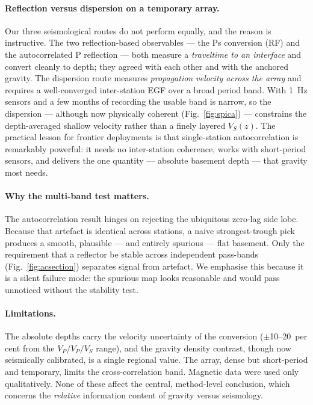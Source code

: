 \paragraph{Reflection versus dispersion on a temporary array.}
Our three seismological routes do not perform equally, and the reason is
instructive. The two reflection-based observables --- the Ps conversion (RF) and
the autocorrelated P reflection --- both measure a \emph{traveltime to an
interface} and convert cleanly to depth; they agreed with each other and with the
anchored gravity. The dispersion route measures \emph{propagation velocity across
the array} and requires a well-converged inter-station EGF over a broad period
band. With 1~Hz sensors and a few months of recording the usable band is narrow,
so the dispersion --- although now physically coherent (Fig.~\ref{fig:spica}) ---
constrains the depth-averaged shallow velocity rather than a finely layered
$V_S(z)$. The practical lesson for frontier deployments is that single-station
autocorrelation is remarkably powerful: it needs no inter-station coherence, works
with short-period sensors, and delivers the one quantity --- absolute basement
depth --- that gravity most needs.

\paragraph{Why the multi-band test matters.}
The autocorrelation result hinges on rejecting the ubiquitous zero-lag side lobe.
Because that artefact is identical across stations, a naive strongest-trough pick
produces a smooth, plausible --- and entirely spurious --- flat basement. Only the
requirement that a reflector be stable across independent pass-bands
(Fig.~\ref{fig:acsection}) separates signal from artefact. We emphasise this
because it is a silent failure mode: the spurious map looks reasonable and would
pass unnoticed without the stability test.

\paragraph{Limitations.}
The absolute depths carry the velocity uncertainty of the conversion
($\pm$10--20~per cent from the $V_P$/$V_P\!/\!V_S$ range), and the gravity density
contrast, though now seismically calibrated, is a single regional value. The
array, dense but short-period and temporary, limits the cross-correlation band.
Magnetic data were used only qualitatively. None of these affect the central,
method-level conclusion, which concerns the \emph{relative} information content of
gravity versus seismology.

